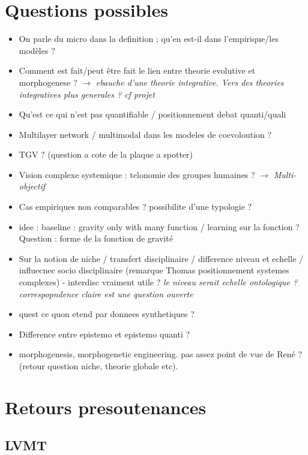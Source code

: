 \documentclass[11pt]{article}
\begin{document}
\section*{Questions possibles}

\begin{itemize}
	\item On parle du micro dans la definition ; qu'en est-il dans l'empirique/les modèles ?
	\item Comment est fait/peut être fait le lien entre theorie evolutive et morphogenese ? $\rightarrow$ \textit{ebauche d'une theorie integrative. Vers des theories integratives plus generales ? cf projet}
	\item Qu'est ce qui n'est pas quantifiable / positionnement debat quanti/quali
	\item Multilayer network / multimodal dans les modeles de coevoloution ?
	\item TGV ? (question a cote de la plaque a spotter)
	\item Vision complexe systemique : telonomie des groupes humaines ? $\rightarrow$ \textit{Multi-objectif}
	\item Cas empiriques non comparables ? possibilite d'une typologie ?
	\item idee : baseline : gravity only with many function / learning sur la fonction ? Question : forme de la fonction de gravité
	\item Sur la notion de niche / transfert disciplinaire / difference niveau et echelle / influecnec socio disciplinaire (remarque Thomas positionnement systemes complexes) - interdisc vraiment utile ? \textit{le niveau serait echelle ontologique ? correspopndence claire est une question ouverte}
	\item quest ce quon etend par donnees synthetiques ?
	\item Difference entre epistemo et epistemo quanti ?
	\item morphogenesis, morphogenetic engineering. pas assez point de vue de René ? (retour question niche, theorie globale etc).
\end{itemize}






\section*{Retours presoutenances}


\subsection*{LVMT}
\end{document}
